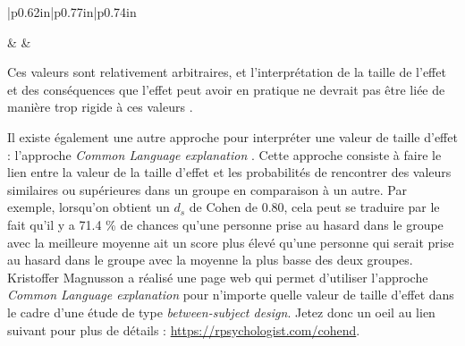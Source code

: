 \documentclass[
  french,
]{book}
\begin{document}
\begin{longtable}[c]{|p{0.62in}|p{0.77in}|p{0.74in}}
\endhead



 &  &  \\




\end{longtable}

Ces valeurs sont relativement arbitraires, et l'interprétation de la taille de l'effet et des conséquences que l'effet peut avoir en pratique ne devrait pas être liée de manière trop rigide à ces valeurs \autocite{lakensCalculatingReportingEffect2013}.

Il existe également une autre approche pour interpréter une valeur de taille d'effet : l'approche \emph{Common Language explanation} \autocite{lakensCalculatingReportingEffect2013}. Cette approche consiste à faire le lien entre la valeur de la taille d'effet et les probabilités de rencontrer des valeurs similaires ou supérieures dans un groupe en comparaison à un autre. Par exemple, lorsqu'on obtient un \(d_{s}\) de Cohen de 0.80, cela peut se traduire par le fait qu'il y a 71.4 \% de chances qu'une personne prise au hasard dans le groupe avec la meilleure moyenne ait un score plus élevé qu'une personne qui serait prise au hasard dans le groupe avec la moyenne la plus basse des deux groupes. Kristoffer Magnusson a réalisé une page web qui permet d'utiliser l'approche \emph{Common Language explanation} pour n'importe quelle valeur de taille d'effet dans le cadre d'une étude de type \emph{between-subject design}. Jetez donc un oeil au lien suivant pour plus de détails : \url{https://rpsychologist.com/cohend}.
\end{document}
